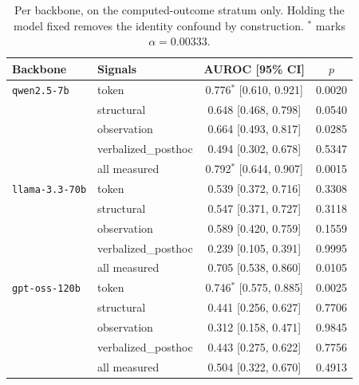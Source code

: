 \begin{table}[t]
\centering
\caption{Per backbone, on the computed-outcome stratum only. Holding the model fixed removes the identity confound by construction. $^{\ast}$ marks $\alpha=0.00333$.}
\label{tab:v2backbone}
\footnotesize
\begin{tabular}{llcc}
\toprule
\textbf{Backbone} & \textbf{Signals} & \textbf{AUROC [95\% CI]} & $p$ \\
\midrule
\texttt{qwen2.5-7b} & token & 0.776$^{\ast}$ [0.610, 0.921] & 0.0020 \\
 & structural & 0.648 [0.468, 0.798] & 0.0540 \\
 & observation & 0.664 [0.493, 0.817] & 0.0285 \\
 & verbalized_posthoc & 0.494 [0.302, 0.678] & 0.5347 \\
 & all measured & 0.792$^{\ast}$ [0.644, 0.907] & 0.0015 \\
\midrule
\texttt{llama-3.3-70b} & token & 0.539 [0.372, 0.716] & 0.3308 \\
 & structural & 0.547 [0.371, 0.727] & 0.3118 \\
 & observation & 0.589 [0.420, 0.759] & 0.1559 \\
 & verbalized_posthoc & 0.239 [0.105, 0.391] & 0.9995 \\
 & all measured & 0.705 [0.538, 0.860] & 0.0105 \\
\midrule
\texttt{gpt-oss-120b} & token & 0.746$^{\ast}$ [0.575, 0.885] & 0.0025 \\
 & structural & 0.441 [0.256, 0.627] & 0.7706 \\
 & observation & 0.312 [0.158, 0.471] & 0.9845 \\
 & verbalized_posthoc & 0.443 [0.275, 0.622] & 0.7756 \\
 & all measured & 0.504 [0.322, 0.670] & 0.4913 \\
\bottomrule
\end{tabular}
\end{table}
